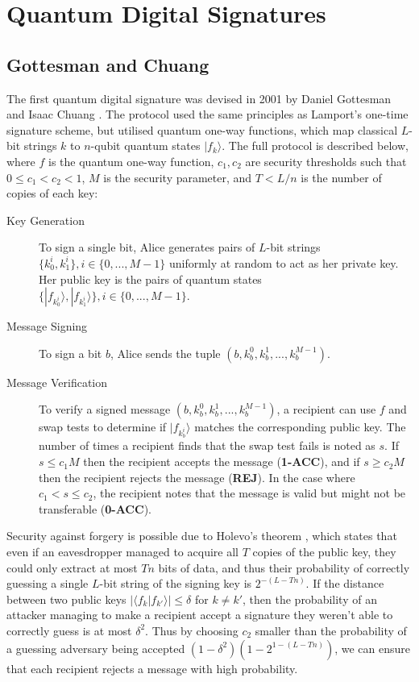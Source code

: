 \documentclass[%
 reprint,
 amsmath,amssymb,
 aps,
 pra,
]{revtex4-1}
\begin{document}
\section{Quantum Digital Signatures}

\subsection{Gottesman and Chuang}

The first quantum digital signature was devised in 2001 by Daniel Gottesman and Isaac Chuang \citep{quant-ph/0105032}. The protocol used the same principles as Lamport's one-time signature scheme, but utilised quantum one-way functions, which map classical $L$-bit strings $k$ to $n$-qubit quantum states $|f_k\rangle$. The full protocol is described below, where $f$ is the quantum one-way function, $c_1, c_2$ are security thresholds such that $0 \leq c_1 < c_2 < 1$, $M$ is the security parameter, and $T < L/n$ is the number of copies of each key:

\begin{description}
\item[Key Generation]To sign a single bit, Alice generates pairs of $L$-bit strings $\{k^i_0, k^i_1\}, i \in \{0,...,M-1\}$ uniformly at random to act as her private key. Her public key is the pairs of quantum states $\{|f_{k^i_0}\rangle, |f_{k^i_1}\rangle\}, i \in \{0,...,M-1\}$.
\item[Message Signing]To sign a bit $b$, Alice sends the tuple $(b, k^0_b, k^1_b,...,k^{M-1}_b)$.
\item[Message Verification]To verify a signed message $(b, k^0_b, k^1_b,...,k^{M-1}_b)$, a recipient can use $f$ and swap tests \cite{PhysRevLett.87.167902} to determine if $|f_{k^i_b}\rangle$ matches the corresponding public key. The number of times a recipient finds that the swap test fails is noted as $s$. If $s \leq c_1M$ then the recipient accepts the message (\textbf{1-ACC}), and if $s \geq c_2M$ then the recipient rejects the message (\textbf{REJ}). In the case where $c_1 < s \leq c_2$, the recipient notes that the message is valid but might not be transferable (\textbf{0-ACC}).
\end{description}

Security against forgery is possible due to Holevo's theorem \cite{Hol73}, which states that even if an eavesdropper managed to acquire all $T$ copies of the public key, they could only extract at most $Tn$ bits of data, and thus their probability of correctly guessing a single $L$-bit string of the signing key is $2^{-(L-Tn)}$. If the distance between two public keys $|\langle f_k|f_{k'}\rangle| \leq \delta$ for $k \neq k'$, then the probability of an attacker managing to make a recipient accept a signature they weren't able to correctly guess is at most $\delta^2$. Thus by choosing $c_2$ smaller than the probability of a guessing adversary being accepted $(1 - \delta^2)(1 - 2^{1 - (L-Tn)})$, we can ensure that each recipient rejects a message with high probability.
\end{document}

